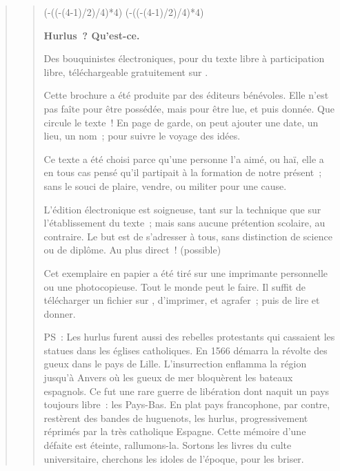 \documentclass[french,twoside]{book} %
\def\truncdiv#1#2{((#1-(#2-1)/2)/#2)}
\def\moduloop#1#2{(#1-\truncdiv{#1}{#2}*#2)}
\def\modulo#1#2{\number\numexpr\moduloop{#1}{#2}\relax}
\begin{document}
\begin{verse}
\begin{verse}
 


\ifbooklet
  \pagestyle{empty}
  \clearpage
  \ifnum\modulo{\value{page}}{4}=0 \hbox{}\newpage\hbox{}\newpage\fi
  \ifnum\modulo{\value{page}}{4}=1 \hbox{}\newpage\hbox{}\newpage\fi


  \hbox{}\newpage
  \ifodd\value{page}\hbox{}\newpage\fi
  {\centering\color{rubric}\bfseries\noindent\large
    Hurlus ? Qu’est-ce.\par
    \bigskip
  }
  \noindent Des bouquinistes électroniques, pour du texte libre à participation libre,
  téléchargeable gratuitement sur \href{https://hurlus.fr}{}.\par
  \bigskip
  \noindent Cette brochure a été produite par des éditeurs bénévoles.
  Elle n’est pas faîte pour être possédée, mais pour être lue, et puis donnée.
  Que circule le texte !
  En page de garde, on peut ajouter une date, un lieu, un nom ; pour suivre le voyage des idées.
  \par

  Ce texte a été choisi parce qu’une personne l’a aimé,
  ou haï, elle a en tous cas pensé qu’il partipait à la formation de notre présent ;
  sans le souci de plaire, vendre, ou militer pour une cause.
  \par

  L’édition électronique est soigneuse, tant sur la technique
  que sur l’établissement du texte ; mais sans aucune prétention scolaire, au contraire.
  Le but est de s’adresser à tous, sans distinction de science ou de diplôme.
  Au plus direct ! (possible)
  \par

  Cet exemplaire en papier a été tiré sur une imprimante personnelle
   ou une photocopieuse. Tout le monde peut le faire.
  Il suffit de
  télécharger un fichier sur \href{https://hurlus.fr}{},
  d’imprimer, et agrafer ; puis de lire et donner.\par

  \bigskip

  \noindent PS : Les hurlus furent aussi des rebelles protestants qui cassaient les statues dans les églises catholiques. En 1566 démarra la révolte des gueux dans le pays de Lille. L’insurrection enflamma la région jusqu’à Anvers où les gueux de mer bloquèrent les bateaux espagnols.
  Ce fut une rare guerre de libération dont naquit un pays toujours libre : les Pays-Bas.
  En plat pays francophone, par contre, restèrent des bandes de huguenots, les hurlus, progressivement réprimés par la très catholique Espagne.
  Cette mémoire d’une défaite est éteinte, rallumons-la. Sortons les livres du culte universitaire, cherchons les idoles de l’époque, pour les briser.
\fi


\end{verse}
\end{verse}
\end{document}
